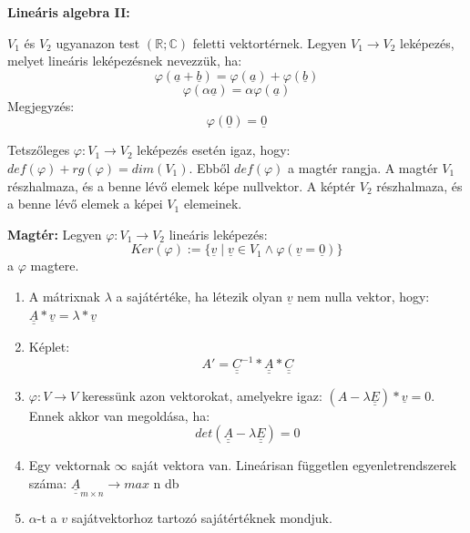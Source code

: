 \documentclass[11pt,a4paper]{article}
\begin{document}
\textbf{Lineáris algebra II:}
\begin{tcolorbox}[colback=blue!5!white,colframe=blue!70!black,title= 1. Lineáris leképezés fogalma]
    \(V_1\) és \(V_2\) ugyanazon test \((\mathbb{R};\mathbb{C})\) feletti vektortérnek. Legyen \(V_1\to V_2\) leképezés, melyet lineáris leképezésnek nevezzük, ha:
    $$\varphi(\underline{a}+\underline{b}) = \varphi (\underline{a}) + \varphi(\underline{b})$$
    $$\varphi (\alpha \underline{a}) = \alpha \varphi(\underline{a})$$
    Megjegyzés: $$\varphi(\underline{0}) = \underline{0}$$
\end{tcolorbox}
\begin{tcolorbox}[colback=blue!5!white,colframe=blue!70!black,title= 2. Rang-nullitás tétele]
    Tetszőleges \(\varphi : V_1 \to V_2\) leképezés esetén igaz, hogy: \(def(\varphi)+rg(\varphi) = dim(V_1)\). Ebből \(def(\varphi)\) a magtér rangja. A magtér
\(V_1\) részhalmaza, és a benne lévő elemek képe nullvektor. A képtér \(V_2\) részhalmaza, és a benne lévő elemek a képei \(V_1\) elemeinek.
\end{tcolorbox}
\begin{tcolorbox}[colback=blue!5!white,colframe=blue!70!black,title= 3. Magtér]
    \textbf{Magtér:} Legyen \(\varphi : V_1 \to V_2\) lineáris leképezés:
    $$Ker(\varphi) := \{\underline{v}\mid \underline{v} \in V_1 \wedge \varphi(\underline{v}=\underline{0})\} $$
    a \(\varphi\) magtere.
\end{tcolorbox}
\begin{tcolorbox}[colback=blue!5!white,colframe=blue!70!black,title= 4. Sajátvektor{,} sajátérték]
    \begin{enumerate}
        \item A mátrixnak \(\lambda\) a sajátértéke, ha létezik olyan \(\underline{v}\) nem nulla vektor, hogy: \(\underline{\underline{A}} * \underline{v} = \lambda *\underline{v}\)
        \item Képlet:
        $$A' = \underline{\underline{C}}^{-1} * \underline{\underline{A}} * \underline{\underline{C}}$$
        \item \(\varphi: V \to V\) keressünk azon vektorokat, amelyekre igaz: \((A-\lambda \underline{\underline{E}})*\underline{v} = 0\). Ennek akkor van megoldása, ha:
        $$det(\underline{\underline{A}}-\lambda\underline{\underline{E}})=0$$
        \item Egy vektornak \(\infty\) saját vektora van. Lineárisan független egyenletrendszerek száma: \(\underline{\underline{A}}_{m\times n}\to max\) n db
        \item \(\alpha\)-t a \(v\) sajátvektorhoz tartozó sajátértéknek mondjuk.
    \end{enumerate}
\end{tcolorbox}
\end{document}
